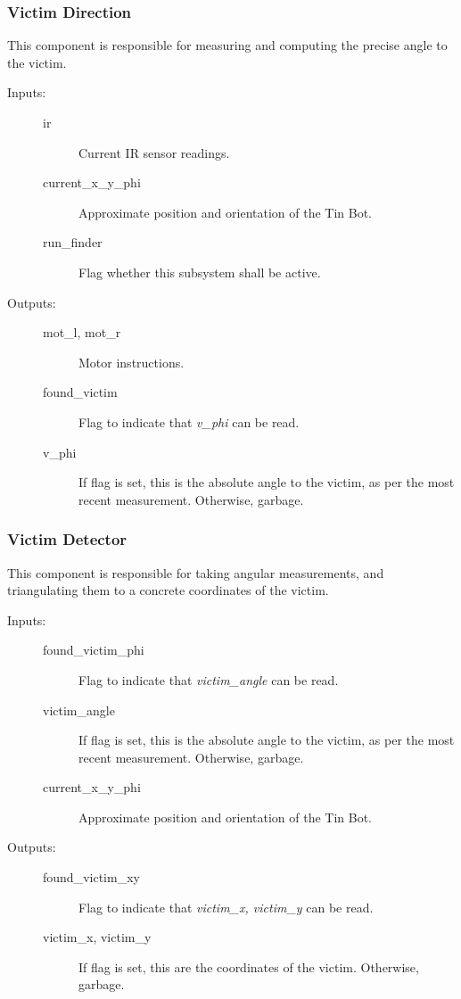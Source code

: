 \documentclass[a4paper,parskip,headheight=38pt]{scrartcl} %
\begin{document}
\subsubsection{Victim Direction}

This component is responsible for measuring and computing the precise angle to the victim.

\begin{description}
\item[Inputs:] \hfill
	\begin{description}
	\item[ir] Current IR sensor readings.
	\item[current\_x\_y\_phi] Approximate position and orientation of the Tin Bot. 
	\item[run\_finder] Flag whether this subsystem shall be active.
	\end{description}
\item[Outputs:] \hfill
	\begin{description}
	\item[mot\_l, mot\_r] Motor instructions.
	\item[found\_victim] Flag to indicate that \emph{v\_phi} can be read.
	\item[v\_phi] If flag is set, this is the absolute angle to the victim, as per the most recent measurement.  Otherwise, garbage.
	\end{description}
\end{description}

\subsubsection{Victim Detector}

This component is responsible for taking angular measurements, and
triangulating them to a concrete coordinates of the victim.

\begin{description}
\item[Inputs:] \hfill
	\begin{description}
	\item[found\_victim\_phi] Flag to indicate that \emph{victim\_angle} can be read.
	\item[victim\_angle] If flag is set, this is the absolute angle to the victim, as per the most recent measurement.  Otherwise, garbage.
	\item[current\_x\_y\_phi] Approximate position and orientation of the Tin Bot. 
	\end{description}
\item[Outputs:] \hfill
	\begin{description}
	\item[found\_victim\_xy] Flag to indicate that \emph{victim\_x, victim\_y} can be read.
	\item[victim\_x, victim\_y] If flag is set, this are the coordinates of the victim.  Otherwise, garbage.
	\end{description}
\end{description}
\end{document}
